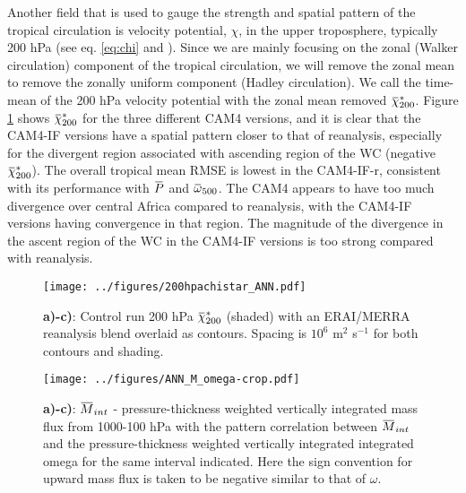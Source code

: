\documentclass[letterpaper,12pt,titlepage,oneside,final]{book}
\newcommand{\overbar}[1]{\mkern 1.5mu\overline{\mkern-1.5mu#1\mkern-1.5mu}\mkern 1.5mu}
\begin{document}
Another field that is used to gauge the strength and spatial pattern of the tropical circulation is velocity potential, $\chi$, in the upper troposphere, typically 200 hPa (see eq. \ref{eq:chi} and \cite{tanaka_trend_2004}). Since we are mainly focusing on the zonal (Walker circulation) component of the tropical circulation, we will remove the zonal mean to remove the zonally uniform component (Hadley circulation). We call the time-mean of the 200 hPa velocity potential with the zonal mean removed $\overbar{\chi}^{*}_{200}$. Figure \ref{fig:chistar} shows $\overbar{\chi}^{*}_{200}$ for the three different CAM4 versions, and it is clear that the CAM4-IF versions have a spatial pattern closer to that of reanalysis, especially for the divergent region associated with ascending region of the WC (negative $\overbar{\chi}^{*}_{200}$). The overall tropical mean RMSE is lowest in the CAM4-IF-r, consistent with its performance with $\overbar{P}$ and $\overbar{\omega}_{500}$. The CAM4 appears to have too much divergence over central Africa compared to reanalysis, with the CAM4-IF versions having convergence in that region. The magnitude of the divergence in the ascent region of the WC in the CAM4-IF versions is too strong compared with reanalysis.
\begin{figure}[H]
\centering
\noindent\texttt{[image: ../figures/200hpachistar\_ANN.pdf]}\hfill
\caption{\textbf{a)-c)}: Control run 200 hPa $\overbar{\chi}^{*}_{200}$ (shaded) with an ERAI/MERRA reanalysis blend overlaid as contours. Spacing is $10^{6}$ m$^{2}$ s$^{-1}$ for both contours and shading.}
\label{fig:chistar}
\end{figure}
\begin{figure}[H]
\centering
\noindent\texttt{[image: ../figures/ANN\_M\_omega-crop.pdf]}\hfill
\caption{\textbf{a)-c)}: $\overbar{M}_{int}$ - pressure-thickness weighted vertically integrated mass flux from 1000-100 hPa with the pattern correlation between $\overbar{M}_{int}$ and the pressure-thickness weighted vertically integrated integrated omega for the same interval indicated. Here the sign convention for upward mass flux is taken to be negative similar to that of $\omega$.}
\label{fig:mcomeg}
\end{figure}
\end{document}
